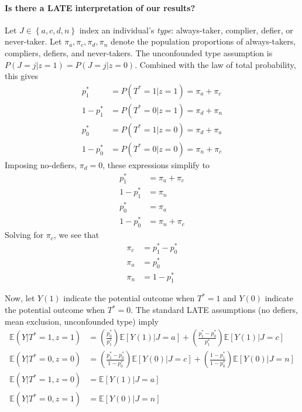 \paragraph{Is there a LATE interpretation of our results?}
Let $J \in \left\{ a, c, d, n \right\}$ index an individual's \emph{type}: always-taker, complier, defier, or never-taker.
Let $\pi_a, \pi_c, \pi_d, \pi_n$ denote the population proportions of always-takers, compliers, defiers, and never-takers.
The unconfounded type assumption is $P(J=j|z=1) = P(J=j|z=0)$.
Combined with the law of total probability, this gives
\begin{align*}
  p^*_1 &= P(T^*=1|z=1) = \pi_a + \pi_c \\
  1 - p^*_1 &= P(T^*=0|z=1) = \pi_d + \pi_n \\
  p^*_0 &= P(T^*=1|z=0) = \pi_d + \pi_a \\
  1-p^*_0 &= P(T^*=0|z=0) = \pi_n + \pi_c 
\end{align*}
Imposing no-defiers, $\pi_d = 0$, these expressions simplify to
\begin{align*}
  p^*_1 &=  \pi_a + \pi_c \\
  1 - p^*_1 &=  \pi_n \\
  p^*_0 &=  \pi_a \\
  1-p^*_0 &=  \pi_n + \pi_c 
\end{align*}
Solving for $\pi_c$, we see that
\begin{align*}
  \pi_c &= p_1^* - p_0^*\\
  \pi_a &= p_0^*\\
  \pi_n &= 1 - p_1^*
\end{align*}

Now, let $Y(1)$ indicate the potential outcome when $T^*=1$ and $Y(0)$ indicate the potential outcome when $T^*=0$.
The standard LATE assumptions (no defiers, mean exclusion, unconfounded type) imply
\begin{align*}
  \mathbb{E}\left( Y| T^* = 1, z = 1 \right) &= \left( \frac{p_0^*}{p_1^*} \right) \mathbb{E}\left[ Y(1)|J=a \right] + \left( \frac{p_1^* - p_0^*}{p_1^*} \right)\mathbb{E}\left[ Y(1)|J=c \right] \\
  \mathbb{E}\left( Y| T^* = 0, z = 0 \right) &= \left( \frac{p_1^* - p_0^*}{1 - p_0^*} \right)\mathbb{E}\left[ Y(0)|J=c \right] + \left( \frac{1 - p_1^*}{1 - p_0^*} \right)\mathbb{E}\left[ Y(0)|J=n \right]\\
  \mathbb{E}\left( Y| T^* = 1, z = 0 \right) &= \mathbb{E}\left[ Y(1)|J=a \right]\\
  \mathbb{E}\left( Y| T^* = 0, z = 1 \right) &= \mathbb{E}\left[ Y(0)|J=n \right]
\end{align*}




